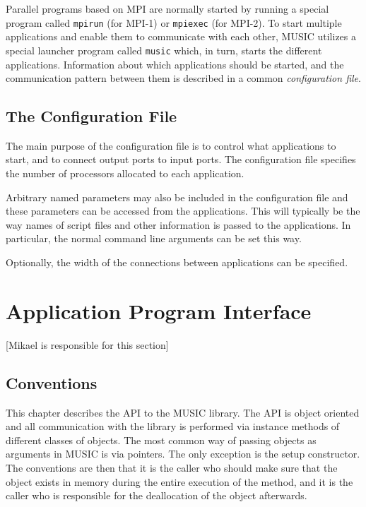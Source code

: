 \documentclass[a4paper]{report}
\newcommand{\responsible}[1]%
{{\color{red}[#1 is responsible for this section]}}
\begin{document}
Parallel programs based on MPI are normally started by running a
special program called \texttt{mpirun} (for MPI-1) or
\texttt{mpiexec} (for MPI-2).  To start multiple
applications and enable them to communicate with each other, MUSIC
utilizes a special launcher program called \texttt{music}
which, in turn, starts the different applications.  Information about
which applications should be started, and the communication pattern
between them is described in a common \emph{configuration
  file}.


\section{The Configuration File}

The main purpose of the configuration file is to control what
applications to start, and to connect output ports to input ports.
The configuration file specifies the number of processors allocated to
each application.

Arbitrary named parameters may also be included in the configuration
file and these parameters can be accessed from the applications.  This
will typically be the way names of script files and other information
is passed to the applications.  In particular, the normal command line
arguments can be set this way.

Optionally, the width of the connections between applications can be
specified.

\begin{code}{}
\end{code}

\chapter{Application Program Interface}
\responsible{Mikael}

\section{Conventions}

This chapter describes the API to the MUSIC library.  The API is
object oriented and all communication with the library is performed
via instance methods of different classes of objects.  The most common
way of passing objects as arguments in MUSIC is via pointers.  The
only exception is the setup constructor.  The conventions are then
that it is the caller who should make sure that the object exists in
memory during the entire execution of the method, and it is the caller
who is responsible for the deallocation of the object afterwards.
\end{document}
